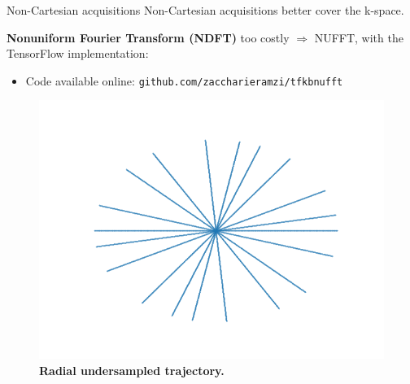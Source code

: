 \begin{frame}{Non-Cartesian acquisitions}
    Non-Cartesian acquisitions better cover the k-space.
    \pause

    \textbf{Nonuniform Fourier Transform (NDFT)} too costly $\Rightarrow$ NUFFT, with the TensorFlow implementation:
    \begin{itemize}
        \item {} Code available online: \texttt{github.com/zaccharieramzi/tfkbnufft}
    \end{itemize}
    \pause
    \begin{figure}
        \centering
        \includegraphics[height=0.5\textheight]{Figures/dl_mri_figures/radial_trajectory.png}
        \caption{\textbf{Radial undersampled trajectory.}}
    \end{figure}
\end{frame}

